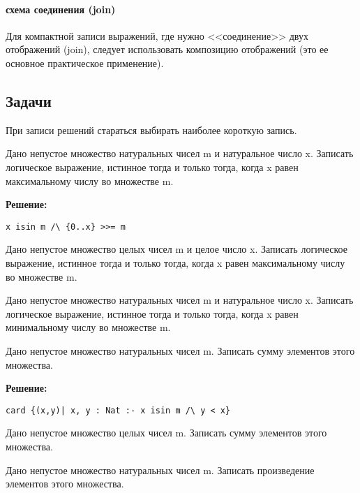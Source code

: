 \paragraph{схема соединения (join)}
Для компактной записи выражений, где нужно <<соединение>> двух отображений (join), следует использовать композицию отображений (это ее основное практическое применение).



\subsection*{Задачи}


При записи решений стараться выбирать наиболее короткую запись.

\z Дано непустое множество натуральных чисел m и натуральное число x. Записать логическое выражение, истинное тогда и только тогда, когда x равен максимальному числу во множестве m.

\textbf{Решение:}

%

\begin{lstlisting}
x isin m /\ {0..x} >>= m
\end{lstlisting}

\z Дано непустое множество целых чисел m и целое число x. Записать логическое выражение, истинное тогда и только тогда, когда x равен максимальному числу во множестве m.

\z Дано непустое множество натуральных чисел m и натуральное число x. Записать логическое выражение, истинное тогда и только тогда, когда x равен минимальному числу во множестве m.

\z Дано непустое множество натуральных чисел m. Записать сумму элементов этого множества.

\textbf{Решение:}
\begin{lstlisting}
card {(x,y)| x, y : Nat :- x isin m /\ y < x}
\end{lstlisting}

\z Дано непустое множество целых чисел m. Записать сумму элементов этого множества.

\z Дано непустое множество натуральных чисел m. Записать произведение элементов этого множества.

